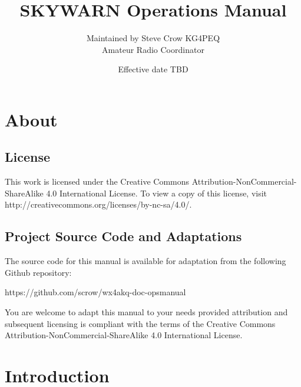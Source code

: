 \documentclass[pdflatex,letterpaper,twoside,12pt]{book}
\title             {SKYWARN Operations Manual}
\author            {Maintained by Steve Crow KG4PEQ\\Amateur Radio Coordinator}
\date              {Effective date TBD}
\begin{document}
\skywarnTitlePage
\skipToTOC
\skywarnTOC


\chapter{About}

\section{License}

This work is licensed under the Creative Commons Attribution-NonCommercial-ShareAlike 4.0 International License. To view a copy of this license, visit\\
http://creativecommons.org/licenses/by-nc-sa/4.0/.

\section{Project Source Code and Adaptations}

The source code for this manual is available for adaptation from the following Github repository:

https://github.com/scrow/wx4akq-doc-opsmanual

You are welcome to adapt this manual to your needs provided attribution and subsequent licensing is compliant with the terms of the Creative Commons Attribution-NonCommercial-ShareAlike 4.0 International License.


\chapter{Introduction}
\end{document}
